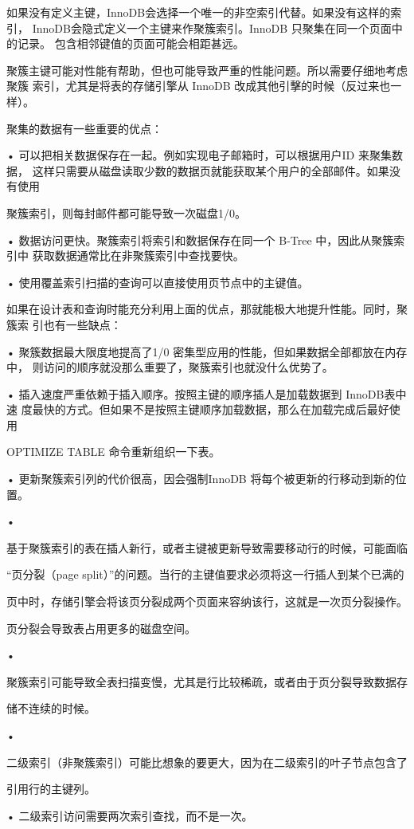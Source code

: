 如果没有定义主键，InnoDB会选择一个唯一的非空索引代替。如果没有这样的索引，
InnoDB会隐式定义一个主键来作聚簇索引。InnoDB 只聚集在同一个页面中的记录。
包含相邻键值的页面可能会相距甚远。

聚簇主键可能对性能有帮助，但也可能导致严重的性能问题。所以需要仔细地考虑聚簇
索引，尤其是将表的存储引擎从 InnoDB 改成其他引擊的时候（反过来也一样）。

聚集的数据有一些重要的优点：

• 可以把相关数据保存在一起。例如实现电子邮箱时，可以根据用户ID 来聚集数据，
这样只需要从磁盘读取少数的数据页就能获取某个用户的全部邮件。如果没有使用

聚簇索引，则每封邮件都可能导致一次磁盘1/0。

• 数据访问更快。聚簇索引将索引和数据保存在同一个 B-Tree 中，因此从聚簇索引中
获取数据通常比在非聚簇索引中查找要快。

• 使用覆盖索引扫描的查询可以直接使用页节点中的主键值。

如果在设计表和查询时能充分利用上面的优点，那就能极大地提升性能。同时，聚簇索
引也有一些缺点：

• 聚簇数据最大限度地提高了1/0 密集型应用的性能，但如果数据全部都放在内存中，
则访问的顺序就没那么重要了，聚簇索引也就没什么优势了。

• 插入速度严重依赖于插入顺序。按照主键的顺序插人是加载数据到 InnoDB表中速
度最快的方式。但如果不是按照主键顺序加载数据，那么在加载完成后最好使用

OPTIMIZE TABLE 命令重新组织一下表。

• 更新聚簇索引列的代价很高，因会强制InnoDB 将每个被更新的行移动到新的位
置。

•

基于聚簇索引的表在插人新行，或者主键被更新导致需要移动行的时候，可能面临

“页分裂（page split）”的问题。当行的主键值要求必须将这一行插人到某个已满的

页中时，存储引擎会将该页分裂成两个页面来容纳该行，这就是一次页分裂操作。

页分裂会导致表占用更多的磁盘空间。

•

聚簇索引可能导致全表扫描变慢，尤其是行比较稀疏，或者由于页分裂导致数据存

储不连续的时候。

•

二级索引（非聚簇索引）可能比想象的要更大，因为在二级索引的叶子节点包含了

引用行的主键列。

• 二级索引访问需要两次索引查找，而不是一次。

